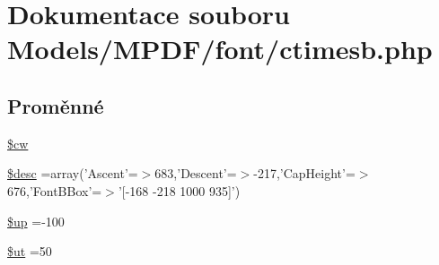 \hypertarget{ctimesb_8php}{\section{Dokumentace souboru Models/\-M\-P\-D\-F/font/ctimesb.php}
\label{ctimesb_8php}
}
\subsection*{Proměnné}
\begin{DoxyCompactItemize}
\item 
\hyperlink{ctimesb_8php_ac2951b03dbb0317e6c61ec920b7479dc}{\$cw}
\item 
\hyperlink{ctimesb_8php_a31059b9e4d0c5af34df20da32232ea9a}{\$desc} =array('Ascent'=$>$683,'Descent'=$>$-\/217,'Cap\-Height'=$>$676,'Font\-B\-Box'=$>$'\mbox{[}-\/168 -\/218 1000 935\mbox{]}')
\item 
\hyperlink{ctimesb_8php_a6b5ad2ac55f9df46e8f34e78fbd6f176}{\$up} =-\/100
\item 
\hyperlink{ctimesb_8php_aadd3f841051043ee58e587e840e8dd0b}{\$ut} =50
\item 

\end{DoxyCompactItemize}
